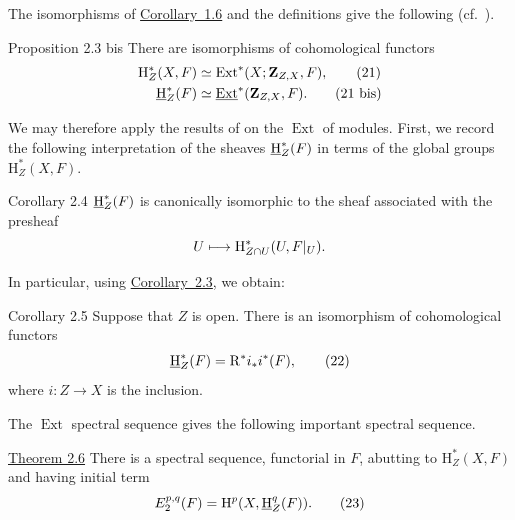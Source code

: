 The isomorphisms of \hyperref[I.1.6]{Corollary~1.6} and the definitions give the following
(cf.\ \cite{Tohoku}).

\begin{sgastatement}{Proposition 2.3 bis}
There are isomorphisms of cohomological functors
\begin{align}
  \mathrm H_Z^*(X,F)
    &\simeq \operatorname{Ext}^*(X;\mathbf Z_{Z,X},F),
    \tag{21}\label{eq:I.21}\\
  \mathop{\underline{\mathrm H}}\nolimits_Z^*(F)
    &\simeq \mathop{\underline{\mathrm{Ext}}}\nolimits^*(\mathbf Z_{Z,X},F).
    \tag{21 bis}\label{eq:I.21bis}
\end{align}
\end{sgastatement}

We may therefore apply the results of \cite{Tohoku} on the $\operatorname{Ext}$
of modules. First, we record the following interpretation of the sheaves
$\mathop{\underline{\mathrm H}}\nolimits_Z^*(F)$ in terms of the global groups $\mathrm H_Z^*(X,F)$.

\begin{sgastatement}{Corollary 2.4}
$\mathop{\underline{\mathrm H}}\nolimits_Z^*(F)$ is canonically isomorphic to the sheaf associated with the
presheaf
\[
  U\longmapsto
  \mathrm H_{Z\cap U}^*(U,F\vert_{U}).
\]
\end{sgastatement}

In particular, using \hyperref[I.2.3bof]{Corollary~2.3}, we obtain:

\begin{sgastatement}{Corollary 2.5}
Suppose that $Z$ is open. There is an isomorphism of cohomological functors
\begin{equation}
  \mathop{\underline{\mathrm H}}\nolimits_Z^*(F)=\mathrm R^*i_*i^*(F),
  \tag{22}\label{eq:I.22}
\end{equation}
where $i\colon Z\to X$ is the inclusion.
\end{sgastatement}

The $\operatorname{Ext}$ spectral sequence gives the following important
spectral sequence.

\begin{sgastatement}{\hyperref[I.2.6]{Theorem 2.6}}
There is a spectral sequence, functorial in $F$, abutting to
$\mathrm H_Z^*(X,F)$ and having initial term
\begin{equation}
  E_2^{p,q}(F)=\mathrm H^p(X,\mathop{\underline{\mathrm H}}\nolimits_Z^q(F)).
  \tag{23}\label{eq:I.23}
\end{equation}
\end{sgastatement}

